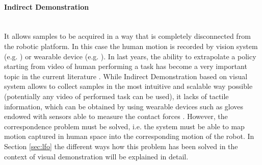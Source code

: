 \paragraph{Indirect Demonstration}  \mbox{} \\ 
It allows samples to be acquired in a way that is completely disconnected from the robotic platform. In this case the human motion is recorded by vision system (e.g. \cite{smith2019avid,sermanet2018time_contrastive}) or wearable device (e.g. \cite{liu2019_mirroring_without_overimitation}). In last years, the ability to extrapolate a policy starting from video of human performing a task has become a very important topic in the current literature \cite{fang2019survey,torabi2019recent_advances_lfo}. While Indirect Demonstration based on visual system allows to collect samples in the most intuitive and scalable way possible (potentially any video of performed task can be used), it lacks of tactile information, which can be obtained by using wearable devices such as gloves endowed with sensors able to measure the contact forces \cite{liu2017glove_force}. However, the correspondence problem must be solved, i.e. the system must be able to map motion captured in human space into the corresponding motion of the robot. In Section \ref{sec:lfo} the different ways how this problem has been solved in the context of visual demonstration will be explained in detail.
